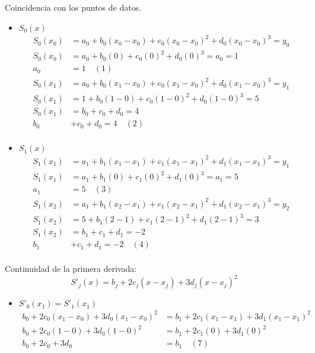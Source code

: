 \documentclass[12pt]{article}
\begin{document}
\begin{enumerate}
    Coincidencia con los puntos de datos.

        \begin{itemize}
            \item $S_0(x)$
            \[ 
            \begin{aligned}
                S_0(x_0) &= a_0 + b_0 (x_0-x_0) + c_0 (x_0-x_0)^2 + d_0 (x_0-x_0)^3 = y_0 \\
                S_0(x_0) &= a_0 + b_0 (0) + c_0 (0)^2 + d_0 (0)^3 = a_0 = 1 \\
                a_0 &= 1 \quad (1)\\
                S_0(x_1) &= a_0 + b_0 (x_1-x_0) + c_0 (x_1-x_0)^2 + d_0 (x_1-x_0)^3 = y_1\\
                S_0(x_1) &= 1 + b_0 (1-0) + c_0 (1-0)^2 + d_0 (1-0)^3 = 5\\
                S_0(x_1) &= b_0 + c_0 + d_0 = 4\\
                b_0& + c_0 + d_0 = 4 \quad (2)\\
            \end{aligned}
            \]
            \item $S_1(x)$
            \[ 
            \begin{aligned}
                S_1(x_1) &= a_1 + b_1 (x_1-x_1) + c_1 (x_1-x_1)^2 + d_1 (x_1-x_1)^3 = y_1 \\
                S_1(x_1) &= a_1 + b_1 (0) + c_1 (0)^2 + d_1 (0)^3 = a_1 = 5 \\
                a_1 &= 5 \quad (3)\\
                S_1(x_2) &= a_1 + b_1 (x_2-x_1) + c_1 (x_2-x_1)^2 + d_1 (x_2-x_1)^3 = y_2\\
                S_1(x_2) &= 5 + b_1 (2-1) + c_1 (2-1)^2 + d_1 (2-1)^3 = 3\\
                S_1(x_2) &=  b_1+ c_1 + d_1= -2\\
                b_1 &+ c_1 + d_1= -2 \quad (4)\\
            \end{aligned}
            \]
        \end{itemize}
    
        Continuidad de la primera derivada:
        \[S'_j(x) = b_j + 2c_j(x - x_j) + 3d_j(x - x_j)^2\]
        
        \begin{itemize}
            \item $S'_0(x_1) =  S'_1(x_1)$
            \[
            \begin{aligned}
            b_0 + 2c_0(x_1 - x_0) + 3d_0(x_1 - x_0)^2 &= b_1 + 2c_1(x_1 - x_1) + 3d_1(x_1 - x_1)^2 \\
            b_0 + 2c_0(1-0) + 3d_0(1-0)^2 &= b_1 + 2c_1(0) + 3d_1(0)^2 \\
            b_0 + 2c_0 + 3d_0 &= b_1 \quad (7) \\
            \end{aligned}
            \]
        \end{itemize}


\end{enumerate}
\end{document}
